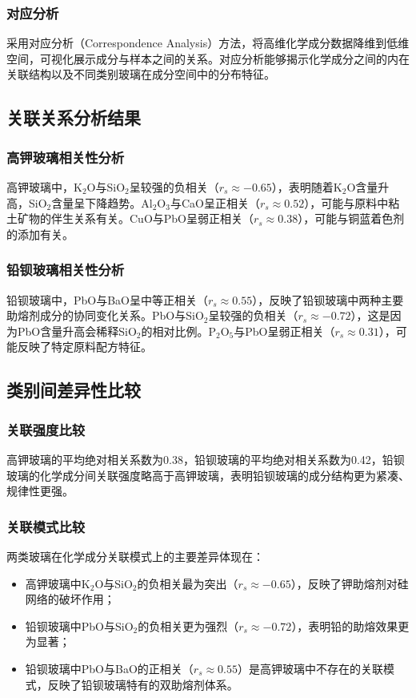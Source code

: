 \documentclass{cumcmthesis}
\begin{document}
\subsubsection{对应分析}
采用对应分析（Correspondence Analysis）方法，将高维化学成分数据降维到低维空间，可视化展示成分与样本之间的关系。对应分析能够揭示化学成分之间的内在关联结构以及不同类别玻璃在成分空间中的分布特征。

\subsection{关联关系分析结果}

\subsubsection{高钾玻璃相关性分析}
高钾玻璃中，K$_2$O与SiO$_2$呈较强的负相关（$r_s \approx -0.65$），表明随着K$_2$O含量升高，SiO$_2$含量呈下降趋势。Al$_2$O$_3$与CaO呈正相关（$r_s \approx 0.52$），可能与原料中粘土矿物的伴生关系有关。CuO与PbO呈弱正相关（$r_s \approx 0.38$），可能与铜蓝着色剂的添加有关。

\subsubsection{铅钡玻璃相关性分析}
铅钡玻璃中，PbO与BaO呈中等正相关（$r_s \approx 0.55$），反映了铅钡玻璃中两种主要助熔剂成分的协同变化关系。PbO与SiO$_2$呈较强的负相关（$r_s \approx -0.72$），这是因为PbO含量升高会稀释SiO$_2$的相对比例。P$_2$O$_5$与PbO呈弱正相关（$r_s \approx 0.31$），可能反映了特定原料配方特征。

\subsection{类别间差异性比较}

\subsubsection{关联强度比较}
高钾玻璃的平均绝对相关系数为0.38，铅钡玻璃的平均绝对相关系数为0.42，铅钡玻璃的化学成分间关联强度略高于高钾玻璃，表明铅钡玻璃的成分结构更为紧凑、规律性更强。

\subsubsection{关联模式比较}
两类玻璃在化学成分关联模式上的主要差异体现在：
\begin{itemize}
    \item 高钾玻璃中K$_2$O与SiO$_2$的负相关最为突出（$r_s \approx -0.65$），反映了钾助熔剂对硅网络的破坏作用；
    \item 铅钡玻璃中PbO与SiO$_2$的负相关更为强烈（$r_s \approx -0.72$），表明铅的助熔效果更为显著；
    \item 铅钡玻璃中PbO与BaO的正相关（$r_s \approx 0.55$）是高钾玻璃中不存在的关联模式，反映了铅钡玻璃特有的双助熔剂体系。
\end{itemize}
\end{document}
